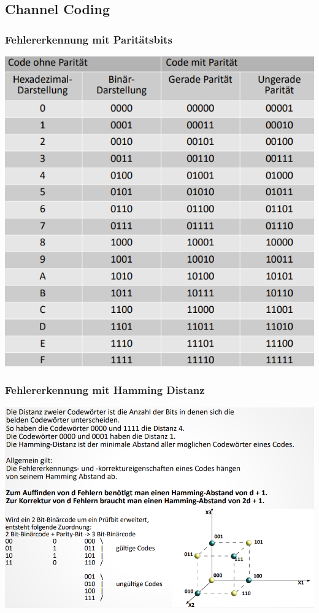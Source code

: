 \documentclass[12pt,a4paper]{article}
\begin{document}
		\subsection{Channel Coding}
			\begin{minipage}[c]{0.4\textwidth}
				\subsubsection{Fehlererkennung mit Paritätsbits}
				\includegraphics[width=\textwidth]{Bilder/paritaetsbit.png}
			\end{minipage}
			\begin{minipage}[c]{0.6\textwidth}
				\subsubsection{Fehlererkennung mit Hamming Distanz}
				\includegraphics[width=\textwidth]{Bilder/hamming-distanz.PNG}
			\end{minipage}
\end{document}
